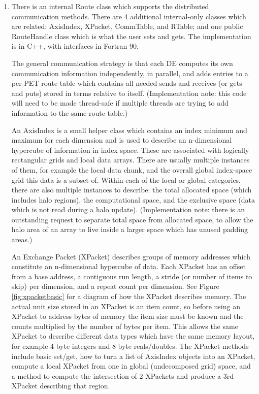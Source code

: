 \begin{enumerate}

\item

There is an internal Route class which supports the distributed
communication methods.  There are 4 additional internal-only
classes which are related: AxisIndex, XPacket, CommTable, and RTable;
and one public RouteHandle class which is what the user sets and gets.
The implementation is in C++, with interfaces in Fortran 90.

The general communication strategy is that each
DE computes its own communication information independently,
in parallel, and adds entries to a per-PET route table
which contains all needed sends and receives (or gets and puts) 
stored in terms relative to itself.  (Implementation note: this
code will need to be made thread-safe if multiple threads are
trying to add information to the same route table.)

An AxisIndex is a small helper class which contains an index minimum
and maximum for each dimension and is used to describe an n-dimensional
hypercube of information in index space.  These are associated with 
logically rectangular grids and local data arrays.  
There are usually multiple instances of them, for example the local
data chunk, and the overall global index-space grid this data is
a subset of.  Within each of the local or global categories, there are
also multiple instances to describe: 
the total allocated space (which includes halo regions), the computational
space, and the exclusive space (data which is not read during a halo update).
(Implementation note: there is an outstanding request to separate total
space from allocated space, to allow the halo area of an array to live
inside a larger space which has unused padding areas.)

An Exchange Packet (XPacket) describes groups of memory addresses
which constitute an n-dimensional hypercube of data.
Each XPacket has an offset from a base address, 
a contiguous run length, 
a stride (or number of items to skip) per dimension,
and a repeat count per dimension. 
See Figure \ref{fig:xpacketbasic} for a diagram of how the XPacket
describes memory.
The actual unit size stored in an XPacket is an item count, 
so before using an XPacket to address bytes of memory
the item size must be known and the
counts multiplied by the number of bytes per item.  This allows
the same XPacket to describe different data types which have the
same memory layout, for example 4 byte integers and 8 byte reals/doubles.
The XPacket methods include basic set/get, how to turn
a list of AxisIndex objects into an XPacket, compute a local XPacket from one
in global (undecomposed grid) space, and a method to compute the intersection
of 2 XPackets and produce a 3rd XPacket describing that region.  


\end{enumerate}
